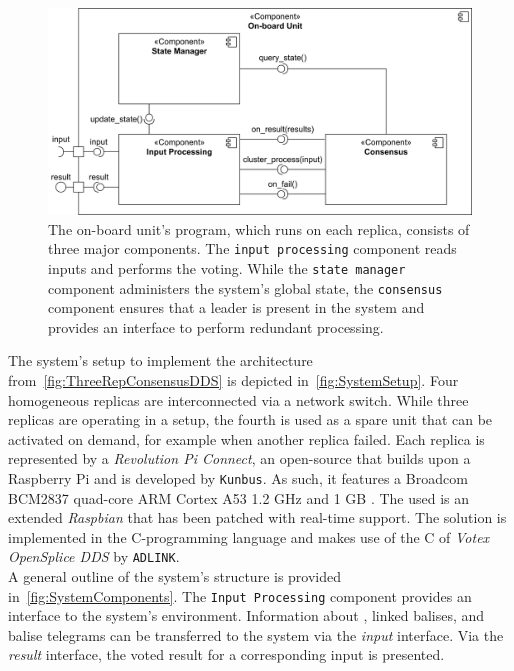 \begin{figure}[!ht]
	\centering
	\includegraphics[width=0.9\linewidth]{images/Components}
	\caption{The on-board unit's program, which runs on each replica, consists of three major components. The \texttt{input processing} component reads inputs and performs the voting. While the \texttt{state manager} component administers the system's global state, the \texttt{consensus} component ensures that a leader is present in the system and provides an interface to perform redundant processing.}
	\label{fig:SystemComponents}
\end{figure}

The system's setup to implement the architecture from~\autoref{fig:ThreeRepConsensusDDS} is depicted in~\autoref{fig:SystemSetup}.
Four homogeneous replicas are interconnected via a network switch.
While three replicas are operating in a  setup, the fourth is used as a spare unit that can be activated on demand, for example when another replica failed.
Each replica is represented by a \textit{Revolution Pi Connect}, an open-source  that builds upon a Raspberry Pi and is developed by \texttt{Kunbus}.
As such, it features a Broadcom BCM2837 quad-core ARM Cortex A53 1.2 GHz  and 1 GB .
The used  is an extended \textit{Raspbian}  that has been patched with real-time support.
The solution is implemented in the C-programming language and makes use of the C  of \textit{Votex OpenSplice DDS} by \texttt{ADLINK}.
\\

\noindent
A general outline of the system's structure is provided in~\autoref{fig:SystemComponents}.
The \texttt{Input Processing} component provides an interface to the system's environment.
Information about , linked balises, and balise telegrams can be transferred to the system via the \textit{input} interface.
Via the \textit{result} interface, the voted result for a corresponding input is presented.
\\

